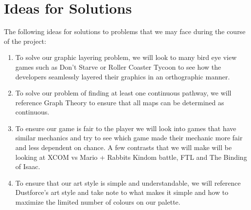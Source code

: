 \documentclass{article}
\begin{document}
\section{Ideas for Solutions}
\quad The following ideas for solutions to problems that we may face during the course of the project:
\begin{enumerate}
	\item To solve our graphic layering problem, we will look to many bird eye view games such as Don't Starve or Roller Coaster Tycoon to see how the developers seamlessly layered their graphics in an orthographic manner.
	\item To solve our problem of finding at least one continuous pathway, we will reference Graph Theory to ensure that all maps can be determined as continuous. 
	\item To ensure our game is fair to the player we will look into games that have similar mechanics and try to see which game made their mechanic more fair and less dependent on chance. A few contrasts that we will make will be looking at XCOM vs Mario + Rabbits Kindom battle, FTL and The Binding of Isaac. %
	\item To ensure that our art style is simple and understandable, we will reference Dustforce's art style and take note to what makes it simple and how to maximize the limited number of colours on our palette.
\end{enumerate}
\end{document}
